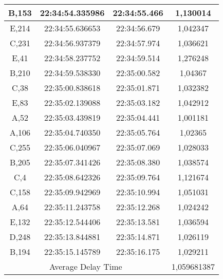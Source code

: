 \begin{table}[H]
\begin{tabular}{|ccc|c|}
    \multicolumn{1}{|c|}{B,153} & \multicolumn{1}{c|}{22:34:54.335986} & 22:34:55.466       & 1,130014    \\ \hline
    \multicolumn{1}{|c|}{E,214} & \multicolumn{1}{c|}{22:34:55.636653} & 22:34:56.679       & 1,042347    \\ \hline
    \multicolumn{1}{|c|}{C,231} & \multicolumn{1}{c|}{22:34:56.937379} & 22:34:57.974       & 1,036621    \\ \hline
    \multicolumn{1}{|c|}{E,41}  & \multicolumn{1}{c|}{22:34:58.237752} & 22:34:59.514       & 1,276248    \\ \hline
    \multicolumn{1}{|c|}{B,210} & \multicolumn{1}{c|}{22:34:59.538330} & 22:35:00.582       & 1,04367     \\ \hline
    \multicolumn{1}{|c|}{C,38}  & \multicolumn{1}{c|}{22:35:00.838618} & 22:35:01.871       & 1,032382    \\ \hline
    \multicolumn{1}{|c|}{E,83}  & \multicolumn{1}{c|}{22:35:02.139088} & 22:35:03.182       & 1,042912    \\ \hline
    \multicolumn{1}{|c|}{A,52}  & \multicolumn{1}{c|}{22:35:03.439819} & 22:35:04.441       & 1,001181    \\ \hline
    \multicolumn{1}{|c|}{A,106} & \multicolumn{1}{c|}{22:35:04.740350} & 22:35:05.764       & 1,02365     \\ \hline
    \multicolumn{1}{|c|}{C,255} & \multicolumn{1}{c|}{22:35:06.040967} & 22:35:07.069       & 1,028033    \\ \hline
    \multicolumn{1}{|c|}{B,205} & \multicolumn{1}{c|}{22:35:07.341426} & 22:35:08.380       & 1,038574    \\ \hline
    \multicolumn{1}{|c|}{C,4}   & \multicolumn{1}{c|}{22:35:08.642326} & 22:35:09.764       & 1,121674    \\ \hline
    \multicolumn{1}{|c|}{C,158} & \multicolumn{1}{c|}{22:35:09.942969} & 22:35:10.994       & 1,051031    \\ \hline
    \multicolumn{1}{|c|}{A,64}  & \multicolumn{1}{c|}{22:35:11.243758} & 22:35:12.268       & 1,024242    \\ \hline
    \multicolumn{1}{|c|}{E,132} & \multicolumn{1}{c|}{22:35:12.544406} & 22:35:13.581       & 1,036594    \\ \hline
    \multicolumn{1}{|c|}{D,248} & \multicolumn{1}{c|}{22:35:13.844881} & 22:35:14.871       & 1,026119    \\ \hline
    \multicolumn{1}{|c|}{B,194} & \multicolumn{1}{c|}{22:35:15.145789} & 22:35:16.175       & 1,029211    \\ \hline
    \multicolumn{3}{|c|}{Average Delay Time}                                                & 1,059681387 \\ \hline
  \end{tabular}
\end{table}


